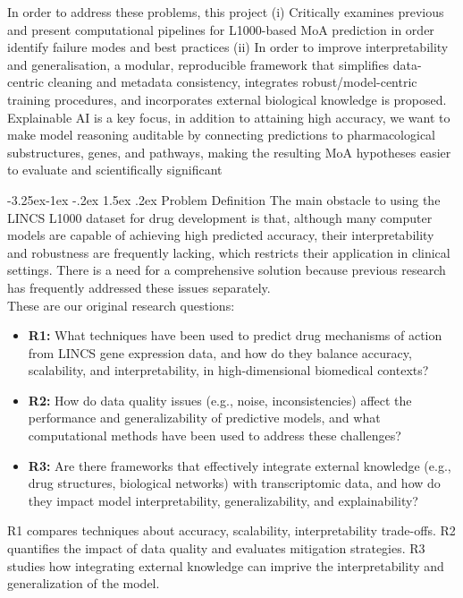 \documentclass[12pt,a4paper]{article}
\makeatletter
\renewcommand\subsection{\@startsection{subsection}{2}{\z@}%
  {-3.25ex\@plus-1ex \@minus-.2ex}%
  {1.5ex \@plus.2ex}%
  {\normalfont\normalsize\bfseries}}
\makeatother
\begin{document}
In order to address these problems, this project (i) Critically examines previous and present computational pipelines for L1000-based MoA prediction in order identify failure modes and best practices (ii) In order to improve interpretability and generalisation, a modular, reproducible framework that simplifies data-centric cleaning and metadata consistency, integrates robust/model-centric training procedures, and incorporates external biological knowledge is proposed. Explainable AI is a key focus, in addition to attaining high accuracy, we want to make model reasoning auditable by connecting predictions to pharmacological substructures, genes, and pathways, making the resulting MoA hypotheses easier to evaluate and scientifically significant\cite{duan2016l1000cds2,stahlschmidt2022multimodal,samal2022opportunities}


\subsection{Problem Definition}
The main obstacle to using the LINCS L1000 dataset for drug development is that, although many computer models are capable of achieving high predicted accuracy, their interpretability and robustness are frequently lacking, which restricts their application in clinical settings.  There is a need for a comprehensive solution because previous research has frequently addressed these issues separately.\\
These are our original research questions:
\begin{itemize}  
  \item \textbf{R1:} What techniques have been used to predict drug mechanisms of action from LINCS gene expression data, and how do they balance accuracy, scalability, and interpretability, in high-dimensional biomedical contexts?
  \item \textbf{R2:} How do data quality issues (e.g., noise, inconsistencies) affect the performance and generalizability of predictive models, and what computational methods have been used to address these challenges?
  \item \textbf{R3:} Are there frameworks that effectively integrate external knowledge (e.g., drug structures, biological networks) with transcriptomic data, and how do they impact model interpretability, generalizability, and explainability?
\end{itemize}

R1 compares techniques about accuracy, scalability, interpretability trade-offs. R2 quantifies the impact of data quality and evaluates mitigation strategies. R3 studies how integrating external knowledge can imprive the interpretability and generalization of the model.
\end{document}
